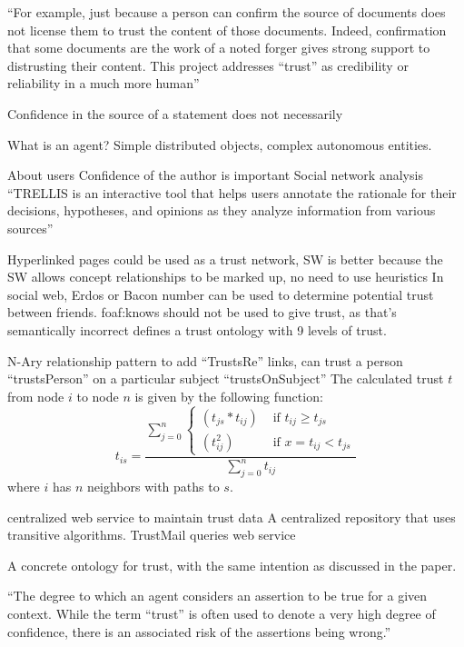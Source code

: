 \documentclass{acm_proc_article-sp}
\begin{document}
``For example, just because a person can confirm the source of documents does not license them to trust the content of those documents. Indeed, confirmation that some documents are the work of a noted forger gives strong support to distrusting their content. This project addresses ``trust'' as credibility or reliability in a much more human''

Confidence in the source of a statement does not necessarily 


What is an agent? Simple distributed objects, complex autonomous entities.
\cite{kalfoglou_emergent_2004}

About users
Confidence of the author is important
Social network analysis
``TRELLIS is an interactive tool that helps users annotate the
rationale for their decisions, hypotheses, and opinions as they analyze information from various sources''\cite{gil_trusting_2002}

Hyperlinked pages could be used as a trust network, SW is better because the SW allows concept relationships to be marked up, no need to use heuristics
In social web, Erdos or Bacon number can be used to determine potential trust between friends.
foaf:knows should not be used to give trust, as that's semantically incorrect
defines a trust ontology with 9 levels of trust.

N-Ary relationship pattern to add ``TrustsRe'' links, can trust a person ``trustsPerson'' on a particular subject ``trustsOnSubject''
The calculated trust $t$ from node $i$ to node $n$ is given by the following function:
\begin{equation}
t_{is}=\frac{\sum_{j=0}^{n}{\begin{cases}
(t_{js}*t_{ij}) & \text{ if } t_{ij} \geq t_{js} \\ 
(t_{ij}^2) & \text{ if } x= t_{ij} < t_{js}
\end{cases}}}{\sum_{j=0}^{n}{t_{ij}}}
\end{equation}
where $i$ has $n$ neighbors with paths to $s$.

centralized web service to maintain trust data
A centralized repository that uses transitive algorithms.
TrustMail queries web service 
\cite{golbeck_trust_2003}

A concrete ontology for trust, with the same intention as discussed in the paper.
\cite{jennifer_golbeck_trust_2013}


``The degree to which an agent considers an assertion to be true for a given context. While the term ``trust'' is often used to denote a very high degree of confidence, there is an associated risk of the assertions being wrong.''
\end{document}
